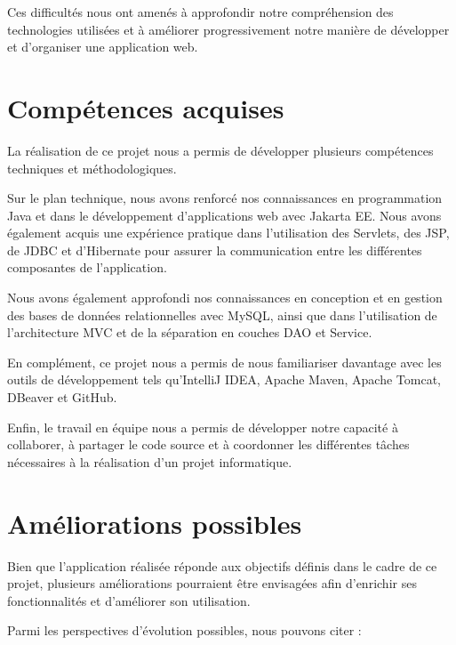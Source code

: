 Ces difficultés nous ont amenés à approfondir notre compréhension des technologies utilisées et à améliorer progressivement notre manière de développer et d'organiser une application web.

\section{Compétences acquises}

La réalisation de ce projet nous a permis de développer plusieurs compétences techniques et méthodologiques.

Sur le plan technique, nous avons renforcé nos connaissances en programmation Java et dans le développement d'applications web avec Jakarta EE. Nous avons également acquis une expérience pratique dans l'utilisation des Servlets, des JSP, de JDBC et d'Hibernate pour assurer la communication entre les différentes composantes de l'application.

Nous avons également approfondi nos connaissances en conception et en gestion des bases de données relationnelles avec MySQL, ainsi que dans l'utilisation de l'architecture MVC et de la séparation en couches DAO et Service.

En complément, ce projet nous a permis de nous familiariser davantage avec les outils de développement tels qu'IntelliJ IDEA, Apache Maven, Apache Tomcat, DBeaver et GitHub.

Enfin, le travail en équipe nous a permis de développer notre capacité à collaborer, à partager le code source et à coordonner les différentes tâches nécessaires à la réalisation d'un projet informatique.

\section{Améliorations possibles}

Bien que l'application réalisée réponde aux objectifs définis dans le cadre de ce projet, plusieurs améliorations pourraient être envisagées afin d'enrichir ses fonctionnalités et d'améliorer son utilisation.

Parmi les perspectives d'évolution possibles, nous pouvons citer :

